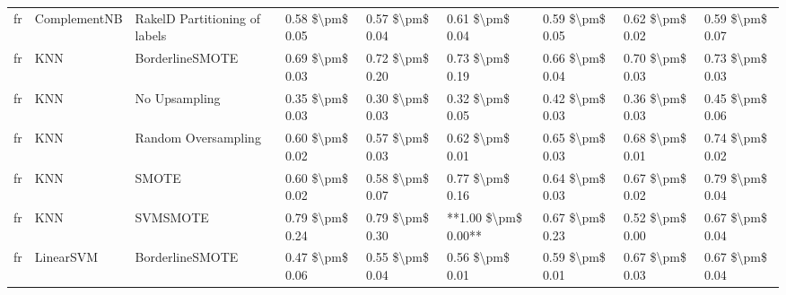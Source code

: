 \begin{tabular}{lllllllll}
      fr &                    ComplementNB & RakelD Partitioning of labels &     0.58 \$\textbackslash pm\$ 0.05 &           0.57 \$\textbackslash pm\$ 0.04 &       0.61 \$\textbackslash pm\$ 0.04 &        0.59 \$\textbackslash pm\$ 0.05 &                         0.62 \$\textbackslash pm\$ 0.02 &     0.59 \$\textbackslash pm\$ 0.07 \\
      fr &                             KNN &               BorderlineSMOTE &     0.69 \$\textbackslash pm\$ 0.03 &           0.72 \$\textbackslash pm\$ 0.20 &       0.73 \$\textbackslash pm\$ 0.19 &        0.66 \$\textbackslash pm\$ 0.04 &                         0.70 \$\textbackslash pm\$ 0.03 &     0.73 \$\textbackslash pm\$ 0.03 \\
      fr &                             KNN &                 No Upsampling &     0.35 \$\textbackslash pm\$ 0.03 &           0.30 \$\textbackslash pm\$ 0.03 &       0.32 \$\textbackslash pm\$ 0.05 &        0.42 \$\textbackslash pm\$ 0.03 &                         0.36 \$\textbackslash pm\$ 0.03 &     0.45 \$\textbackslash pm\$ 0.06 \\
      fr &                             KNN &           Random Oversampling &     0.60 \$\textbackslash pm\$ 0.02 &           0.57 \$\textbackslash pm\$ 0.03 &       0.62 \$\textbackslash pm\$ 0.01 &        0.65 \$\textbackslash pm\$ 0.03 &                         0.68 \$\textbackslash pm\$ 0.01 &     0.74 \$\textbackslash pm\$ 0.02 \\
      fr &                             KNN &                         SMOTE &     0.60 \$\textbackslash pm\$ 0.02 &           0.58 \$\textbackslash pm\$ 0.07 &       0.77 \$\textbackslash pm\$ 0.16 &        0.64 \$\textbackslash pm\$ 0.03 &                         0.67 \$\textbackslash pm\$ 0.02 &     0.79 \$\textbackslash pm\$ 0.04 \\
      fr &                             KNN &                      SVMSMOTE &     0.79 \$\textbackslash pm\$ 0.24 &           0.79 \$\textbackslash pm\$ 0.30 &   **1.00 \$\textbackslash pm\$ 0.00** &        0.67 \$\textbackslash pm\$ 0.23 &                         0.52 \$\textbackslash pm\$ 0.00 &     0.67 \$\textbackslash pm\$ 0.04 \\
      fr &                       LinearSVM &               BorderlineSMOTE &     0.47 \$\textbackslash pm\$ 0.06 &           0.55 \$\textbackslash pm\$ 0.04 &       0.56 \$\textbackslash pm\$ 0.01 &        0.59 \$\textbackslash pm\$ 0.01 &                         0.67 \$\textbackslash pm\$ 0.03 &     0.67 \$\textbackslash pm\$ 0.04 \\

\end{tabular}
